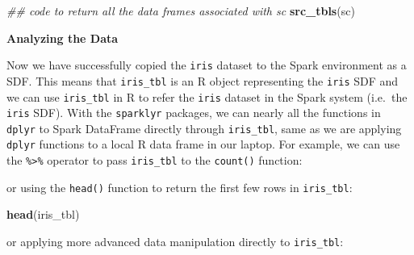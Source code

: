 \documentclass[12pt,]{krantz}
\makeatletter
\newenvironment{Shaded}{\begin{snugshade}}{\end{snugshade}}
\newcommand{\CommentTok}[1]{\textcolor[rgb]{0.37,0.37,0.37}{\textit{#1}}}
\newcommand{\DataTypeTok}[1]{\textcolor[rgb]{0.27,0.27,0.27}{#1}}
\newcommand{\DecValTok}[1]{\textcolor[rgb]{0.06,0.06,0.06}{#1}}
\newcommand{\KeywordTok}[1]{\textcolor[rgb]{0.27,0.27,0.27}{\textbf{#1}}}
\newcommand{\NormalTok}[1]{#1}
\newcommand{\OperatorTok}[1]{\textcolor[rgb]{0.43,0.43,0.43}{\textbf{#1}}}
\newcommand{\StringTok}[1]{\textcolor[rgb]{0.5,0.5,0.5}{#1}}
\newenvironment{kframe}{%
\medskip{}
\setlength{\fboxsep}{.8em}
 \def\at@end@of@kframe{}%
 \ifinner\ifhmode%
  \def\at@end@of@kframe{\end{minipage}}%
  \begin{minipage}{\columnwidth}%
 \fi\fi%
 \def\FrameCommand##1{\hskip\@totalleftmargin \hskip-\fboxsep
 \colorbox{shadecolor}{##1}\hskip-\fboxsep
     \hskip-\linewidth \hskip-\@totalleftmargin \hskip\columnwidth}%
 \MakeFramed {\advance\hsize-\width
   \@totalleftmargin\z@ \linewidth\hsize
   \@setminipage}}%
 {\par\unskip\endMakeFramed%
 \at@end@of@kframe}
\renewenvironment{Shaded}{\begin{kframe}}{\end{kframe}}
\makeatother
\begin{document}
\begin{Shaded}
\begin{Highlighting}[]
\CommentTok{## code to return all the data frames associated with sc}
\KeywordTok{src_tbls}\NormalTok{(sc) }
\end{Highlighting}
\end{Shaded}

\textbf{Analyzing the Data}

Now we have successfully copied the \texttt{iris} dataset to the Spark environment as a SDF. This means that \texttt{iris\_tbl} is an R object representing the \texttt{iris} SDF and we can use \texttt{iris\_tbl} in R to refer the \texttt{iris} dataset in the Spark system (i.e.~the \texttt{iris} SDF). With the \texttt{sparklyr} packages, we can nearly all the functions in \texttt{dplyr} to Spark DataFrame directly through \texttt{iris\_tbl}, same as we are applying \texttt{dplyr} functions to a local R data frame in our laptop. For example, we can use the \texttt{\%\textgreater{}\%} operator to pass \texttt{iris\_tbl} to the \texttt{count()} function:

\begin{Shaded}
\end{Shaded}

or using the \texttt{head()} function to return the first few rows in \texttt{iris\_tbl}:

\begin{Shaded}
\begin{Highlighting}[]
\KeywordTok{head}\NormalTok{(iris_tbl)}
\end{Highlighting}
\end{Shaded}

or applying more advanced data manipulation directly to \texttt{iris\_tbl}:

\begin{Shaded}
\end{Shaded}
\end{document}
